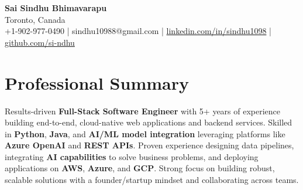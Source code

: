 \documentclass[letterpaper,11pt]{article}
\begin{document}
\begin{center}
  {\Large \textbf{Sai Sindhu Bhimavarapu}} \\
  Toronto, Canada \\
  +1-902-977-0490 \enspace | \enspace sindhu10988@gmail.com \enspace | \enspace \href{https://www.linkedin.com/in/sindhu1098/}{linkedin.com/in/sindhu1098} \enspace | \enspace \href{https://github.com/si-ndhu}{github.com/si-ndhu}
\end{center}

\section{Professional Summary}
  \begin{itemize}[leftmargin=0.15in, label={}]
    \small{\item{
     Results-driven \textbf{Full-Stack Software Engineer} with 5+ years of experience building end-to-end, cloud-native web applications and backend services. Skilled in \textbf{Python}, \textbf{Java}, and \textbf{AI/ML model integration} leveraging platforms like \textbf{Azure OpenAI} and \textbf{REST APIs}. Proven experience designing data pipelines, integrating \textbf{AI capabilities} to solve business problems, and deploying applications on \textbf{AWS}, \textbf{Azure}, and \textbf{GCP}. Strong focus on building robust, scalable solutions with a founder/startup mindset and collaborating across teams.
    }}
  \end{itemize}
\vspace{-16pt}

\end{document}

